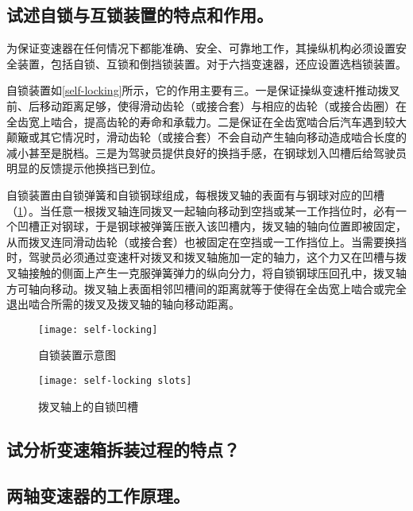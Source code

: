 \documentclass[UTF8]{ctexart}
\numberwithin{figure}{section}
\numberwithin{table}{section}
\begin{document}
\subsection{试述自锁与互锁装置的特点和作用。}

为保证变速器在任何情况下都能准确、安全、可靠地工作，其操纵机构必须设置安全装置，包括自锁、互锁和倒挡锁装置。对于六挡变速器，还应设置选档锁装置。

自锁装置如\cref{self-locking}所示，它的作用主要有三。一是保证操纵变速杆推动拨叉前、后移动距离足够，使得滑动齿轮（或接合套）与相应的齿轮（或接合齿圈）在全齿宽上啮合，提高齿轮的寿命和承载力。二是保证在全齿宽啮合后汽车遇到较大颠簸或其它情况时，滑动齿轮（或接合套）不会自动产生轴向移动造成啮合长度的减小甚至是脱档。三是为驾驶员提供良好的换挡手感，在钢球划入凹槽后给驾驶员明显的反馈提示他换挡已到位。

自锁装置由自锁弹簧和自锁钢球组成，每根拨叉轴的表面有与钢球对应的凹槽（\cref{self-locking slots}）。当任意一根拨叉轴连同拨叉一起轴向移动到空挡或某一工作挡位时，必有一个凹槽正对钢球，于是钢球被弹簧压嵌入该凹槽内，拨叉轴的轴向位置即被固定，从而拨叉连同滑动齿轮（或接合套）也被固定在空挡或一工作挡位上。当需要换挡时，驾驶员必须通过变速杆对拨叉和拨叉轴施加一定的轴力，这个力又在凹槽与拨叉轴接触的侧面上产生一克服弹簧弹力的纵向分力，将自锁钢球压回孔中，拨叉轴方可轴向移动。拨叉轴上表面相邻凹槽间的距离就等于使得在全齿宽上啮合或完全退出啮合所需的拨叉及拨叉轴的轴向移动距离。



\begin{figure}[htbp]
	\centering
	\begin{minipage}[b]{0.6\textwidth}
		\centering
		\texttt{[image: self-locking]}
		\caption{自锁装置示意图}
		\label{self-locking}
	\end{minipage}
	\centering
	\begin{minipage}[b]{0.35\textwidth}
		\centering
		\texttt{[image: self-locking slots]}
		\caption{拨叉轴上的自锁凹槽}
		\label{self-locking slots}
	\end{minipage}
\end{figure}

\subsection{试分析变速箱拆装过程的特点？}
\subsection{两轴变速器的工作原理。}
\newpage
\end{document}
